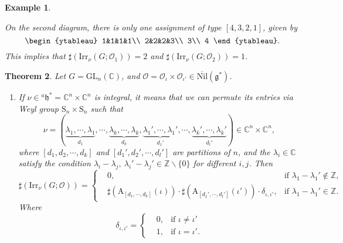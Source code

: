 \documentclass[12pt, a4paper]{amsart}
\numberwithin{equation}{section}
\newtheorem{thm}{Theorem}[section]
\newtheorem{examp}[thm]{Example}
\newcommand{\BC}{{\mathbb {C}}}
\newcommand{\BZ}{{\mathbb {Z}}}
\newcommand{\CO}{{\mathcal {O}}}
\newcommand{\fg}{\mathfrak{g}}
\newcommand{\fh}{\mathfrak{h}}
\newcommand{\GL}{{\mathrm{GL}}}
\newcommand{\A}{{\mathrm{A}}}
\newcommand{\Irr}{{\mathrm{Irr}}}
\newcommand{\Nil}{{\mathrm{Nil}}}
\renewcommand{\bar}{\overline}
\begin{document}
\begin{examp}
\begin{enumerate}
            On the second diagram, there is only one assignment of type $[4,3,2,1]$, given by
            \[
                \begin{ytableau}
                    1&1&1&1\\
                    2&2&2&3\\
                    3\\
                    4
                \end{ytableau}.
            \]
            This implies that $\sharp(\Irr_{\nu}(G;\CO_1)) = 2$ and $\sharp(\Irr_{\nu}(G;\CO_2)) = 1$.
    \end{enumerate}
\end{examp}


\begin{thm}\label{C}
    Let $G = \GL_{n}(\BC)$, and $\CO = \CO_{\iota} \times \CO_{\iota'} \in \bar{\Nil}(\fg^*)$.
    \begin{enumerate}
        \item If $\nu \in {^a\fh^*} = \BC^n \times \BC^n$ is integral, it means that we can permute its entries via Weyl group $\mathrm{S}_n \times \mathrm{S}_n$ such that
        \[
        \nu =  (\underbrace{\lambda_1, \cdots, \lambda_1}_{d_1}, \cdots, \underbrace{\lambda_k, \cdots, \lambda_k}_{d_k}, \underbrace{\lambda_1', \cdots, \lambda_1'}_{d_1'}, \cdots, \underbrace{\lambda_k', \cdots, \lambda_k'}_{d_{l}'} ) \in \BC^n \times \BC^n, 
        \]
        where $[d_1,d_2,\cdots,d_k]$ and $[d_1',d_2',\cdots,d_l']$ are partitions of $n$, and the $\lambda_i \in \BC$ satisfy the condition $\lambda_i - \lambda_j, \ \lambda_i' - \lambda_j' \in \BZ \backslash \{0\}$ for different $i,j$. Then
        \begin{equation}
            \sharp(\Irr_{\nu}(G;\CO)) = \left\{ 
            \begin{aligned}
                &0, & \textrm{if $\lambda_1 - \lambda_1' \notin \BZ$},\\
                &\sharp(\A_{[d_1,\cdots,d_k]}(\iota)) \cdot \sharp(\A_{[d_1',\cdots,d_l']}(\iota')) \cdot \delta_{\iota,\iota'} , & \textrm{if $\lambda_1 - \lambda_1' \in \BZ$}.
            \end{aligned}
            \right.
        \end{equation}
        Where $$\delta_{\iota,\iota'} = \left\{
        \begin{aligned}
            &0, & \textrm{if $\iota \neq  \iota'$}\\
            &1, & \textrm{if $\iota = \iota'$}.
        \end{aligned}
$$
\end{enumerate}
\end{thm}
\end{document}
